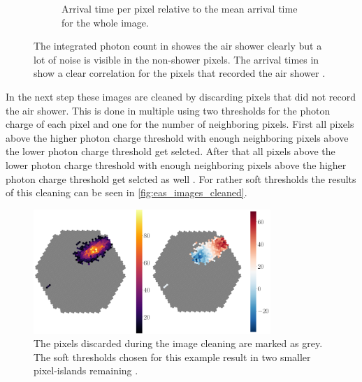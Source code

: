 \begin{figure}
\begin{subfigure}{0.49\textwidth}
        \caption{Arrival time per pixel relative to the mean arrival time for the whole image.}
        \label{fig:eas_image2}
    \end{subfigure}
    \caption{The integrated photon count in  showes the air shower clearly but a lot of noise is visible in the non-shower pixels.
        The arrival times in  show a clear correlation for the pixels that recorded the air shower \cite{lukas}.
    }
    \label{fig:eas_images}
\end{figure}

In the next step these images are cleaned by discarding pixels that did not record the air shower. 
This is done in multiple using two thresholds for the photon charge of each pixel and one for the number of neighboring pixels.
First all pixels above the higher photon charge threshold with enough neighboring pixels above the lower photon charge threshold get selcted.
After that all pixels above the lower photon charge threshold with enough neighboring pixels above the higher photon charge threshold get selcted as well \cite{lukas}.
For rather soft thresholds the results of this cleaning can be seen in \autoref{fig:eas_images_cleaned}.
\begin{figure}
    \centering
    \includegraphics[width=0.8\textwidth]{images/eas_images_cleaned.png}
    \caption{The pixels discarded during the image cleaning are marked as grey. The soft thresholds chosen for this example result in two smaller pixel-islands remaining \cite{lukas}.}
    \label{fig:eas_images_cleaned}
\end{figure}

